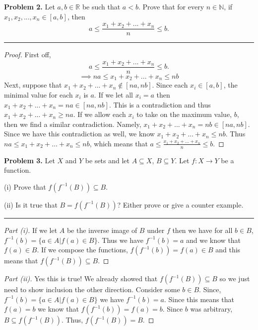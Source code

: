 \documentclass[leqno]{article}
\theoremstyle{nonumberplain}
\newtheorem{proof}{Proof}
\begin{document}
\noindent\textbf{Problem 2.} Let $a,b \in \mathbb{R}$ be such that $a < b$. Prove that for every $n\in \mathbb{N}$, if $x_1 , x_2, ..., x_n \in [a,b]$, then
\[
a \leq \frac{x_1 + x_2 + ... + x_n}{n} \leq b.
\]
\noindent\rule[0.5ex]{\linewidth}{1pt}

\begin{proof}
First off,
\[
a \leq \frac{x_1 + x_2 + ... + x_n}{n} \leq b.
\]
\[
\implies na \leq x_1 +x_2+...+x_n \leq nb
\]
Next, suppose that $x_1 +x_2 +...+ x_n \notin [na,nb]$.  Since each $x_i\in [a,b]$, the minimal value for each $x_i$ is $a$.  If we let all $x_i=a$ then $x_1 + x_2 +...+x_n=na\in [na, nb]$.  This is a contradiction and thus $x_1 + x_2 + ... +x_n \geq na$.  If we allow each $x_i$ to take on the maximum value, $b$, then we find a similar contradiction.  Namely, $x_1 + x_2 +...+x_n = nb \in [na,nb]$. Since we have this contradiction as well, we know $x_1 + x_2 + ... +x_n \leq nb$.  Thus $na \leq x_1 + x_2 + ... +x_n \leq nb$, which means that $a \leq \frac{x_1 + x_2 + ... + x_n}{n} \leq b$.
\end{proof}

\pagebreak




\noindent\textbf{Problem 3.} Let $X$ and $Y$ be sets and let $A \subseteq X$, $B\subseteq Y$. Let $f \colon X \to Y$ be a function.  

(i) Prove that $f(f^{-1}(B)) \subseteq B$.

(ii) Is it true that $B=f(f^{-1}(B))$? Either prove or give a counter example.

\noindent\rule[0.5ex]{\linewidth}{1pt}

\begin{proof}[Part (i)]
If we let $A$ be the inverse image of $B$ under $f$ then we have for all $b\in B$, $f^{-1}(b)=\{a \in A | f(a) \in B \}$.  Thus we have $f^{-1}(b)=a$ and we know that $f(a)\in B$.  If we compose the functions, $f(f^{-1}(b))=f(a)\in B$  and this means that $f(f^{-1}(B))\subseteq B$.
\end{proof}

\begin{proof}[Part (ii)]
Yes this is true!  We already showed that $ f(f^{-1}(B))\subseteq B$ so we just need to show inclusion the other direction.  Consider some $b\in B$.  Since, $f^{-1}(b)=\{a \in A | f(a) \in B \}$ we have $f^{-1}(b)=a$.  Since this means that $f(a)=b$ we know that $f(f^{-1}(b))=f(a)=b$.  Since $b$ was arbitrary, $B \subseteq f(f^{-1}(B))$.  Thus, $f(f^{-1}(B))=B$.
\end{proof}
\end{document}
